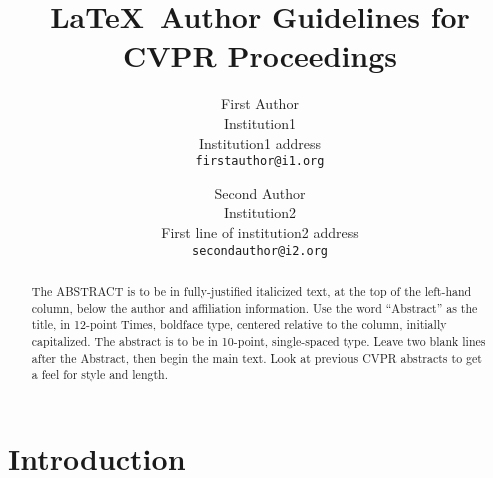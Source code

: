 \documentclass[10pt,twocolumn,letterpaper]{article}
\begin{document}
\title{\LaTeX\ Author Guidelines for CVPR Proceedings}

\author{First Author\\
Institution1\\
Institution1 address\\
{\tt\small firstauthor@i1.org}
\and
Second Author\\
Institution2\\
First line of institution2 address\\
{\tt\small secondauthor@i2.org}
}

\maketitle

\begin{abstract}
   The ABSTRACT is to be in fully-justified italicized text, at the top
   of the left-hand column, below the author and affiliation
   information. Use the word ``Abstract'' as the title, in 12-point
   Times, boldface type, centered relative to the column, initially
   capitalized. The abstract is to be in 10-point, single-spaced type.
   Leave two blank lines after the Abstract, then begin the main text.
   Look at previous CVPR abstracts to get a feel for style and length.
\end{abstract}

\section{Introduction}

\end{document}
